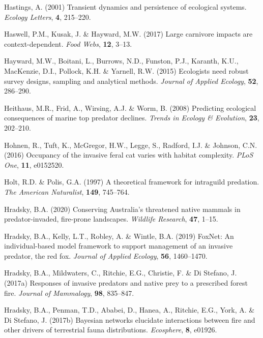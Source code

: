 \documentclass[11pt,a4paper,titlepage,twoside,openright]{style/unimelbthesis}
\begin{document}
\begin{mainmatter}
\leavevmode\hypertarget{ref-hastings2001transient}{}%
Hastings, A. (2001) Transient dynamics and persistence of ecological systems. \emph{Ecology Letters}, \textbf{4}, 215--220.

\leavevmode\hypertarget{ref-haswell2017large}{}%
Haswell, P.M., Kusak, J. \& Hayward, M.W. (2017) Large carnivore impacts are context-dependent. \emph{Food Webs}, \textbf{12}, 3--13.

\leavevmode\hypertarget{ref-hayward2015ecologists}{}%
Hayward, M.W., Boitani, L., Burrows, N.D., Funston, P.J., Karanth, K.U., MacKenzie, D.I., Pollock, K.H. \& Yarnell, R.W. (2015) Ecologists need robust survey designs, sampling and analytical methods. \emph{Journal of Applied Ecology}, \textbf{52}, 286--290.

\leavevmode\hypertarget{ref-heithaus2008predicting}{}%
Heithaus, M.R., Frid, A., Wirsing, A.J. \& Worm, B. (2008) Predicting ecological consequences of marine top predator declines. \emph{Trends in Ecology \& Evolution}, \textbf{23}, 202--210.

\leavevmode\hypertarget{ref-hohnen2016occupancy}{}%
Hohnen, R., Tuft, K., McGregor, H.W., Legge, S., Radford, I.J. \& Johnson, C.N. (2016) Occupancy of the invasive feral cat varies with habitat complexity. \emph{PLoS One}, \textbf{11}, e0152520.

\leavevmode\hypertarget{ref-holt1997theoretical}{}%
Holt, R.D. \& Polis, G.A. (1997) A theoretical framework for intraguild predation. \emph{The American Naturalist}, \textbf{149}, 745--764.

\leavevmode\hypertarget{ref-hradsky2020conserving}{}%
Hradsky, B.A. (2020) Conserving Australia's threatened native mammals in predator-invaded, fire-prone landscapes. \emph{Wildlife Research}, \textbf{47}, 1--15.

\leavevmode\hypertarget{ref-hradsky2019foxnet}{}%
Hradsky, B.A., Kelly, L.T., Robley, A. \& Wintle, B.A. (2019) FoxNet: An individual-based model framework to support management of an invasive predator, the red fox. \emph{Journal of Applied Ecology}, \textbf{56}, 1460--1470.

\leavevmode\hypertarget{ref-hradsky2017responses}{}%
Hradsky, B.A., Mildwaters, C., Ritchie, E.G., Christie, F. \& Di Stefano, J. (2017a) Responses of invasive predators and native prey to a prescribed forest fire. \emph{Journal of Mammalogy}, \textbf{98}, 835--847.

\leavevmode\hypertarget{ref-hradsky2017bayesian}{}%
Hradsky, B.A., Penman, T.D., Ababei, D., Hanea, A., Ritchie, E.G., York, A. \& Di Stefano, J. (2017b) Bayesian networks elucidate interactions between fire and other drivers of terrestrial fauna distributions. \emph{Ecosphere}, \textbf{8}, e01926.


\end{mainmatter}
\end{document}
